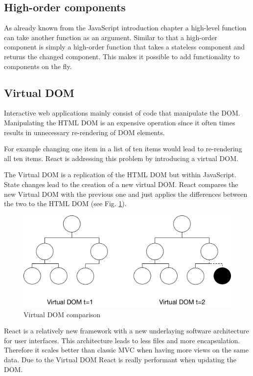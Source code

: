 \subsection{High-order components}

As already known from the JavaScript introduction chapter
a high-level function can take another function as an argument.
Similar to that a high-order component is simply a high-order function
that takes a stateless component and returns the changed component. 
This makes it possible to add functionality to components on the fly. 








\subsection{Virtual DOM}

Interactive web applications mainly consist of code that manipulate the DOM. 
Manipulating the HTML DOM is an expensive operation
since it often times results in unnecessary re-rendering of DOM elements.

For example changing one item in a list of ten items would lead to re-rendering all ten items.
React is addressing this problem by introducing a virtual DOM. 

The Virtual DOM is a replication of the HTML DOM but within JavaScript.
State changes lead to the creation of a new virtual DOM. React compares the new Virtual DOM with the previous one 
and just applies the differences between the two to the HTML DOM  (see Fig. \ref{fig:VirtualDom}).

\begin{figure}[H]
	\centering
	\includegraphics[width=0.8\linewidth]{bilder/grundlagen/VirtualDom.png}
	\caption{Virtual DOM comparison}
	\label{fig:VirtualDom}
\end{figure}

React is a relatively new framework with a new underlaying software architecture for user interfaces. This architecture leads to less files and more encapsulation. Therefore it scales better than classic MVC when having more views on the same data. Due to the Virtual DOM React is really performant when updating the DOM.

